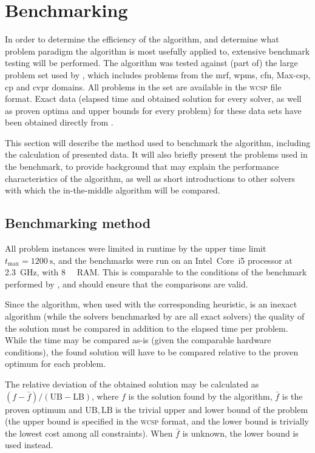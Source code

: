 \section{Benchmarking}
In order to determine the efficiency of the algorithm, and determine what problem paradigm the algorithm is most usefully applied to, extensive benchmark testing will be performed.
The algorithm was tested against (part of) the large problem set used by \textcite{deGivry14}, which includes problems from the \gls{mrf}, \gls{wpms}, \gls{cfn}, Max-\gls{csp}, \gls{cp} and \gls{cvpr} domains.
All problems in the set are available in the \textsc{wcsp} file format.
Exact data (elapsed time and obtained solution for every solver, as well as proven optima and upper bounds for every problem) for these data sets have been obtained directly from \citeauthor{deGivry14}.

This section will describe the method used to benchmark the algorithm, including the calculation of presented data.
It will also briefly present the problems used in the benchmark, to provide background that may explain the performance characteristics of the algorithm, as well as short introductions to other solvers with which the in-the-middle algorithm will be compared.

\subsection{Benchmarking method}
All problem instances were limited in runtime by the upper time limit \(t_{\text{max}} = \SI{1200}{\second}\), and the benchmarks were run on an Intel~Core~i5 processor at \SI{2.3}{\giga\hertz}, with \SI{8}{\gibi\byte} RAM.
This is comparable to the conditions of the benchmark performed by \textcite{deGivry14}, and should ensure that the comparisons are valid.

Since the algorithm, when used with the corresponding heuristic, is an inexact algorithm (while the solvers benchmarked by \textcite{deGivry14} are all exact solvers) the quality of the solution must be compared in addition to the elapsed time per problem.
While the time may be compared as-is (given the comparable hardware conditions), the found solution will have to be compared relative to the proven optimum for each problem.

\label{pg:bench-method}
The relative deviation of the obtained solution may be calculated as \((f - \bar{f})/(\mathrm{UB}-\mathrm{LB})\), where \(f\) is the solution found by the algorithm, \(\bar{f}\) is the proven optimum and \(\mathrm{UB}, \mathrm{LB}\) is the trivial upper and lower bound of the problem (the upper bound is specified in the \textsc{wcsp} format, and the lower bound is trivially the lowest cost among all constraints).
When \(\bar{f}\) is unknown, the lower bound is used instead.

